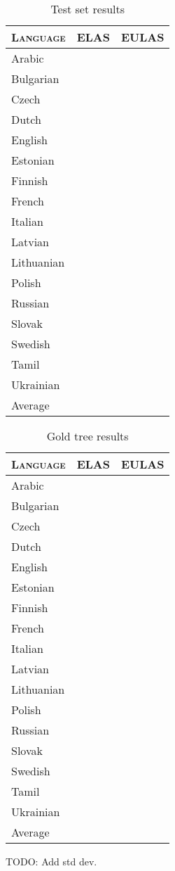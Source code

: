 \documentclass[11pt,a4paper]{article}
\begin{document}
\begin{table}[h]
	\centering
	\begin{tabular}{l|rr}
		\textsc{Language} & \textsc{ELAS} & \textsc{EULAS} \\
		\hline
		Arabic &  & \\
		Bulgarian &  & \\
		Czech &  & \\
		Dutch &  & \\
		English &  & \\
		Estonian &  & \\
		Finnish &  & \\
		French &  & \\
		Italian &  & \\
		Latvian &  & \\
		Lithuanian &  & \\
		Polish &  & \\
		Russian &  & \\
		Slovak &  & \\
		Swedish &  & \\
		Tamil &  & \\
		Ukrainian &  & \\
		Average &  & \\
	\end{tabular}
\caption{Test set results}
\end{table}

\begin{table}[h]
	\centering
	\begin{tabular}{l|rr}
		\textsc{Language} & \textsc{ELAS} & \textsc{EULAS} \\
		\hline 
		Arabic &  & \\
		Bulgarian &  & \\
		Czech &  & \\
		Dutch &  & \\
		English &  & \\
		Estonian &  & \\
		Finnish &  & \\
		French &  & \\
		Italian &  & \\
		Latvian &  & \\
		Lithuanian &  & \\
		Polish &  & \\
		Russian &  & \\
		Slovak &  & \\
		Swedish &  & \\
		Tamil &  & \\
		Ukrainian &  & \\
		Average &  & \\ 
	\end{tabular}
	\caption{Gold tree results}
\end{table} 
TODO: Add std dev.
\end{document}
